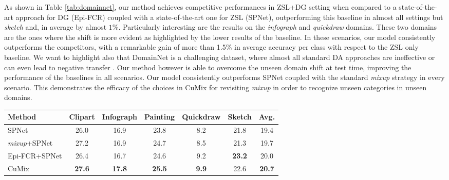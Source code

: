\documentclass[runningheads]{llncs}
\newcommand{\methodName}{{CuMix} }
\begin{document}
As shown in Table \ref{tab:domainnet}, our method achieves competitive performances in ZSL+DG setting when compared to a state-of-the-art approach for DG (Epi-FCR) coupled with a state-of-the-art one for ZSL (SPNet), outperforming this baseline in almost all settings but \textit{sketch} and, in average by almost $1\%$. Particularly interesting are the results on the \textit{infograph} and \textit{quickdraw} domains. These two domains are the ones where the shift is more evident as highlighted by the lower results of the baseline. In these scenarios, our model consistently outperforms the competitors, with a remarkable gain of more than 1.5\% in average accuracy per class with respect to the ZSL only baseline. We want to highlight also that DomainNet is a challenging dataset, where almost all standard DA approaches are ineffective or can even lead to negative transfer \cite{peng2019moment}. Our method however is able to overcome the unseen domain shift at test time, improving the performance of the baselines in all scenarios. Our model consistently outperforms SPNet coupled with the standard \textit{mixup} strategy in every scenario. This demonstrates the efficacy of the choices in \methodName for revisiting \textit{mixup} in order to recognize unseen categories in unseen domains.

\begin{table*}[t]
			\caption{ZSL+DG scenario on the DomainNet dataset with ResNet-50 as backbone.} 
		\centering
		
		{\small
		\begin{tabular}{ l |  c  c  c  c  c | c   }
		Method&Clipart&Infograph&Painting&Quickdraw&Sketch&Avg.\\
		\hline
                             SPNet    &{26.0}  &16.9  & 23.8 & 8.2  & 21.8  &19.4 \\
		                           \textit{mixup}+SPNet    &27.2  &16.9  & 24.7 & 8.5  & 21.3  & 19.7\\
		
        \multirow{1}{*}{Epi-FCR+SPNet}
                               &{26.4} & 16.7  & 24.6  & 9.2 & \textbf{23.2}    &20.0\\
        \hline
        \methodName    
                                     &\textbf{27.6} &\textbf{17.8}  & \textbf{25.5}  & \textbf{9.9}  &{22.6}  & \textbf{20.7}  \\
		\end{tabular}}
		\label{tab:domainnet}
\end{table*}
\end{document}
